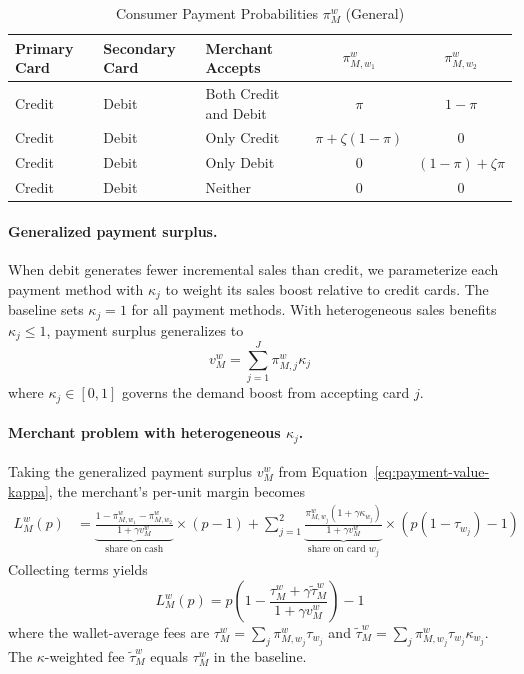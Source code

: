 \documentclass[main.tex]{subfiles}
\begin{document}
\begin{table}[ht]
    \centering
    \caption{Consumer Payment Probabilities $\pi^w_M$ (General)}
    \label{tab:consumer-payment-probs}
    \small
    \begin{tabular}{lll cc}
        \toprule
        \textbf{Primary Card} & \textbf{Secondary Card} & \textbf{Merchant Accepts} & $\pi^w_{M,w_1}$ & $\pi^w_{M,w_2}$ \\
        \midrule
        Credit  & Debit & Both Credit and Debit  & $\pi$ & $1-\pi$ \\
        Credit  & Debit & Only Credit           & $\pi + \zeta(1{-}\pi)$ & 0 \\
        Credit  & Debit & Only Debit          & 0 & $(1{-}\pi) + \zeta\pi$ \\
        Credit  & Debit & Neither             & 0 & 0 \\
        \bottomrule
    \end{tabular}
\end{table}

\paragraph{Generalized payment surplus.}
When debit generates fewer incremental sales than credit, we parameterize each payment method with $\kappa_j$ to weight its sales boost relative to credit cards.
The baseline sets $\kappa_j=1$ for all payment methods.
With heterogeneous sales benefits $\kappa_j\leq 1$, payment surplus generalizes to
\begin{equation}
    v_M^w = \sum_{j=1}^{J} \pi^w_{M,j} \kappa_j \label{eq:payment-value-kappa}
\end{equation}
where $\kappa_j\in[0,1]$ governs the demand boost from accepting card $j$.

\paragraph{Merchant problem with heterogeneous $\kappa_j$.}
Taking the generalized payment surplus $v_M^w$ from Equation~\eqref{eq:payment-value-kappa}, the merchant's per-unit margin becomes
\begin{align}
L_{M}^{w}\left(p\right)
&= \underbrace{\frac{1-\pi_{M,w_{1}}^{w}-\pi_{M,w_{2}}^{w}}{1+\gamma v_{M}^{w}}}_{\text{share on cash}}\times\left(p-1\right)+\sum_{j=1}^{2}\underbrace{\frac{\pi_{M,w_{j}}^{w}\left(1+\gamma\kappa_{w_{j}}\right)}{1+\gamma v_{M}^{w}}}_{\text{share on card }w_{j}}\times\left(p\left(1-\tau_{w_{j}}\right)-1\right)
\end{align}
Collecting terms yields
\begin{equation}
L_{M}^{w}\left(p\right) = p\left(1-\frac{\tau_{M}^{w}+\gamma\tilde{\tau}_{M}^{w}}{1+\gamma v_{M}^{w}}\right)-1
\end{equation}
where the wallet-average fees are $\tau_M^w = \sum_j \pi_{M,w_j}^w \tau_{w_j}$ and $\tilde{\tau}_M^w = \sum_j \pi_{M,w_j}^w \tau_{w_j} \kappa_{w_j}$.
The $\kappa$-weighted fee $\tilde{\tau}_M^w$ equals $\tau_M^w$ in the baseline.
\end{document}
